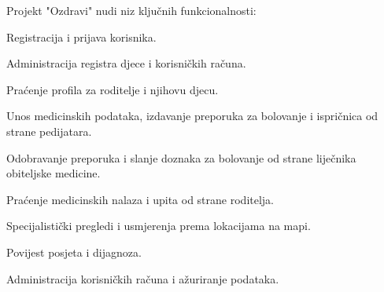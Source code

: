 Projekt "Ozdravi" nudi niz ključnih funkcionalnosti:
\begin{packed_item}
    \item Registracija i prijava korisnika.
    \item Administracija registra djece i korisničkih računa.
    \item Praćenje profila za roditelje i njihovu djecu.
    \item Unos medicinskih podataka, izdavanje preporuka za bolovanje i ispričnica od strane pedijatara.
    \item Odobravanje preporuka i slanje doznaka za bolovanje od strane liječnika obiteljske medicine.
    \item Praćenje medicinskih nalaza i upita od strane roditelja.
    \item Specijalistički pregledi i usmjerenja prema lokacijama na mapi.
    \item Povijest posjeta i dijagnoza.
    \item Administracija korisničkih računa i ažuriranje podataka.
\end{packed_item}

